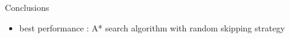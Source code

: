 \documentclass[final]{beamer}
\begin{document}
\begin{frame}{ }
\begin{columns}[t]
\begin{column}{.28\linewidth}
            \begin{block}{Conclusions}
                \begin{itemize}
                    \item best performance : A* search algorithm with random skipping strategy
                \end{itemize}
            \end{block}

        \end{column}
    \end{columns}
\end{frame}
\end{document}
